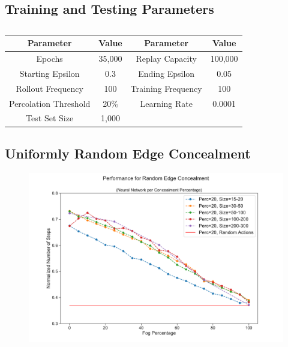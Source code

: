 \clearpage
\vspace{-2em}
\subsection{Training and Testing Parameters}
\begin{table}[ht]
    \centering \footnotesize
    \begin{tabular}{||c | c || c | c ||} 
        \hline
        Parameter & Value & Parameter & Value\\ [0.5ex] 
        \hline\hline
        Epochs & 35,000 & Replay Capacity & 100,000\\ 
        \hline
        Starting Epsilon & 0.3 & Ending Epsilon & 0.05\\
        \hline
        Rollout Frequency & 100 & Training Frequency & 100\\
        \hline
        Percolation Threshold & 20\% & Learning Rate & 0.0001\\
        \hline
        Test Set Size & 1,000 & & \\ [1ex] 
        \hline
    \end{tabular}
    \caption[Caption Information]{\blindtext}
    \label{table:parameters}
\end{table}

\newpage
\subsection{Uniformly Random Edge Concealment}
\vspace{-2em}
\begin{figure}[h]
\sffamily\bfseries
    \centering
    \includegraphics[scale=0.49]{Figures/percolation20_n200-300_k2-6_g2-3_random,all_fog.pdf}
    \caption[Caption Information]{\blindtext}
    \label{figure:random uniform (all models)}
\end{figure}


